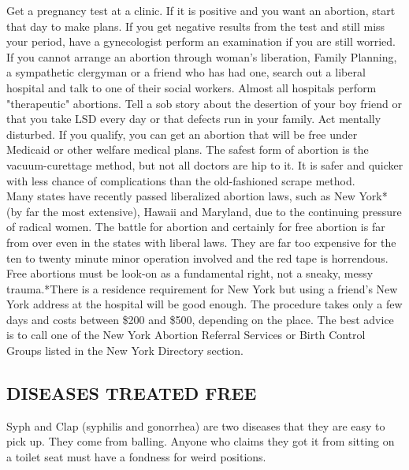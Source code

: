 \documentclass[11pt,twoside,a4paper]{book}
\begin{document}
Get a pregnancy test at a clinic. If it is positive and you want an abortion, start that day to make plans. If you get negative results from the test and still miss your period, have a gynecologist perform an examination if you are still worried.~\\

If you cannot arrange an abortion through woman's liberation, Family Planning, a sympathetic clergyman or a friend who has had one, search out a liberal hospital and talk to one of their social workers. Almost all hospitals perform "therapeutic" abortions. Tell a sob story about the desertion of your boy friend or that you take LSD every day or that defects run in your family. Act mentally disturbed. If you qualify, you can get an abortion that will be free under Medicaid or other welfare medical plans. The safest form of abortion is the vacuum-curettage method, but not all doctors are hip to it. It is safer and quicker with less chance of complications than the old-fashioned scrape method.~\\

Many states have recently passed liberalized abortion laws, such as New York* (by far the most extensive), Hawaii and Maryland, due to the continuing pressure of radical women. The battle for abortion and certainly for free abortion is far from over even in the states with liberal laws. They are far too expensive for the ten to twenty minute minor operation involved and the red tape is horrendous. Free abortions must be look-on as a fundamental right, not a sneaky, messy trauma.*There is a residence requirement for New York but using a friend's New York address at the hospital will be good enough. The procedure takes only a few days and costs between \$200 and \$500, depending on the place. The best advice is to call one of the New York Abortion Referral Services or Birth Control Groups listed in the New York Directory section.

\subsection{DISEASES TREATED FREE}

Syph and Clap (syphilis and gonorrhea) are two diseases that they are easy to pick up. They come from balling. Anyone who claims they got it from sitting on a toilet seat must have a fondness for weird positions.~\\
\end{document}

